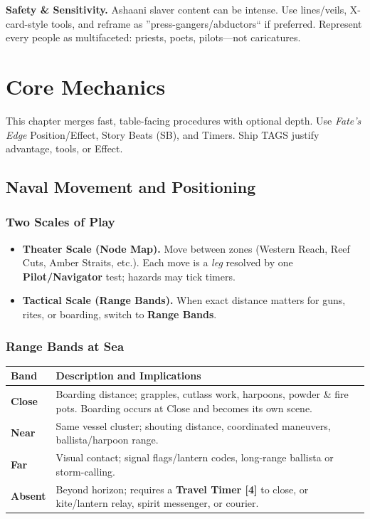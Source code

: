\documentclass[11pt,oneside]{book}
\begin{document}
\begin{tcolorbox}[breakable]
\textbf{Safety \& Sensitivity.} Ashaani slaver content can be intense. Use lines/veils, X-card-style tools, and reframe as ''press-gangers/abductors`` if preferred. Represent every people as multifaceted: priests, poets, pilots---not caricatures.
\end{tcolorbox}

\chapter{Core Mechanics}

\noindent This chapter merges fast, table-facing procedures with optional depth. Use \textit{Fate's Edge} Position/Effect, Story Beats (SB), and Timers. Ship TAGS justify advantage, tools, or Effect.

\section{Naval Movement and Positioning}

\subsection*{Two Scales of Play}
\begin{itemize}
  \item \textbf{Theater Scale (Node Map).} Move between zones (Western Reach, Reef Cuts, Amber Straits, etc.). Each move is a \emph{leg} resolved by one \textbf{Pilot/Navigator} test; hazards may tick timers.
  \item \textbf{Tactical Scale (Range Bands).} When exact distance matters for guns, rites, or boarding, switch to \textbf{Range Bands}.
\end{itemize}

\subsection*{Range Bands at Sea}
\begin{tabularx}{\linewidth}{@{}l X@{}}
\toprule
\textbf{Band} & \textbf{Description and Implications}\\
\midrule
\textbf{Close} & Boarding distance; grapples, cutlass work, harpoons, powder \& fire pots. Boarding occurs at Close and becomes its own scene.\\
\textbf{Near} & Same vessel cluster; shouting distance, coordinated maneuvers, ballista/harpoon range.\\
\textbf{Far} & Visual contact; signal flags/lantern codes, long-range ballista or storm-calling.\\
\textbf{Absent} & Beyond horizon; requires a \textbf{Travel Timer [4]} to close, or kite/lantern relay, spirit messenger, or courier.\\
\bottomrule
\end{tabularx}
\end{document}
